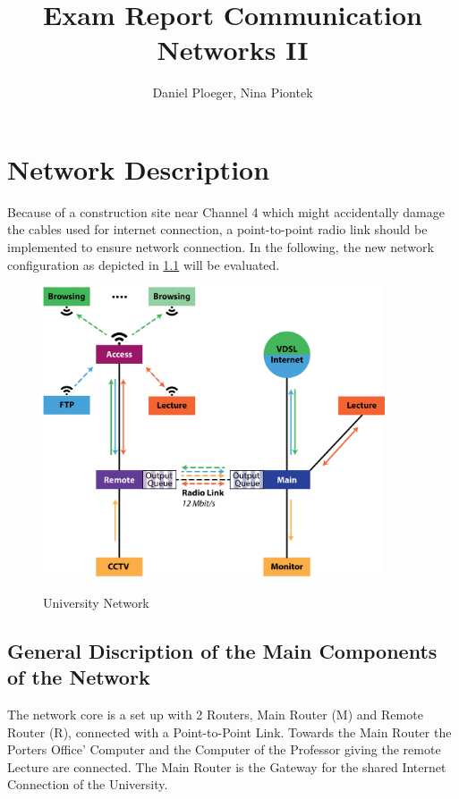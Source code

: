 \documentclass[a4paper,10pt]{book}\usepackage{graphicx}
\title{Exam Report Communication Networks II}
\author{Daniel Ploeger, Nina Piontek}
\begin{document}
\maketitle
\tableofcontents



\chapter{Network Description}
Because of a construction site near Channel 4 which might accidentally damage the cables 
used for internet connection,
a point-to-point radio link should be implemented to ensure network connection.
In the following, the new network configuration as depicted in \ref{fig:network} will be evaluated.
\begin{figure}[!ht]
  \centering
    \includegraphics[width=0.9\textwidth]{graphics-03.eps}
    \label{fig:network}
    \caption{University Network}
\end{figure}

\section{General Discription of the Main Components of the Network}
The network core is a set up with 2 Routers, Main Router (M) and Remote Router (R), connected with a Point-to-Point Link. 
Towards the Main Router the Porters Office' Computer and the Computer of the Professor giving the remote Lecture are connected.
The Main Router is the Gateway for the shared Internet Connection of the University.
\end{document}
